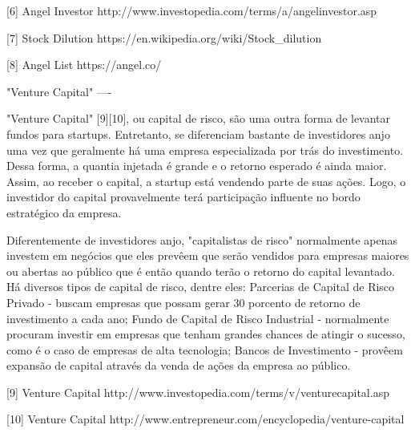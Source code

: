 [6] Angel Investor
http://www.investopedia.com/terms/a/angelinvestor.asp

[7] Stock Dilution
https://en.wikipedia.org/wiki/Stock_dilution

[8] Angel List
https://angel.co/


"Venture Capital"
----

"Venture Capital" [9][10], ou capital de risco, são uma outra forma de levantar fundos para startups. Entretanto, se diferenciam bastante de investidores anjo uma vez que geralmente há uma empresa especializada por trás do investimento. Dessa forma, a quantia injetada é grande e o retorno esperado é ainda maior. Assim, ao receber o capital, a startup está vendendo parte de suas ações. Logo, o investidor do capital provavelmente terá participação influente no bordo estratégico da empresa.

Diferentemente de investidores anjo, "capitalistas de risco" normalmente apenas investem em negócios que eles prevêem que serão vendidos para empresas maiores ou abertas ao público que é então quando terão o retorno do capital levantado. Há diversos tipos de capital de risco, dentre eles: Parcerias de Capital de Risco Privado - buscam empresas que possam gerar 30 porcento de retorno de investimento a cada ano; Fundo de Capital de Risco Industrial - normalmente procuram investir em empresas que tenham grandes chances de atingir o sucesso, como é o caso de empresas de alta tecnologia; Bancos de Investimento - provêem expansão de capital através da venda de ações da empresa ao público.

[9] Venture Capital
http://www.investopedia.com/terms/v/venturecapital.asp

[10] Venture Capital
http://www.entrepreneur.com/encyclopedia/venture-capital
